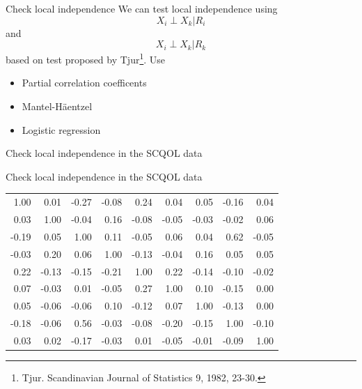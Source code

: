 \documentclass{beamer}
\begin{document}
\begin{frame}{Check local independence}
We can test local independence using
$$
X_i\perp X_k|R_i
$$
and
$$
X_i\perp X_k|R_k
$$
based on test proposed by Tjur\footnote{Tjur. Scandinavian Journal of Statistics 9, 1982, 23-30.}. Use
\begin{itemize}
\item Partial correlation coefficents
\item Mantel-H{\"a}entzel
\item Logistic regression
\end{itemize}
\end{frame}


\begin{frame}{Check local independence in the SCQOL data}

\end{frame}


\begin{frame}{Check local independence in the SCQOL data}
\begin{center}
\begin{tabular}{|rrrrrrrrr|}
\hline
 1.00 & 0.01 &-0.27 &-0.08 & 0.24 & 0.04 & 0.05 &-0.16 & 0.04 \\
 0.03 & 1.00 &-0.04 & 0.16 &-0.08 &-0.05 &-0.03 &-0.02 & 0.06 \\
-0.19 & 0.05 & 1.00 & 0.11 &-0.05 & 0.06 & 0.04 & 0.62 &-0.05 \\
-0.03 & 0.20 & 0.06 & 1.00 &-0.13 &-0.04 & 0.16 & 0.05 & 0.05 \\
 0.22 &-0.13 &-0.15 &-0.21 & 1.00 & 0.22 &-0.14 &-0.10 &-0.02 \\
 0.07 &-0.03 & 0.01 &-0.05 & 0.27 & 1.00 & 0.10 &-0.15 & 0.00 \\
 0.05 &-0.06 &-0.06 & 0.10 &-0.12 & 0.07 & 1.00 &-0.13 & 0.00 \\
-0.18 &-0.06 & 0.56 &-0.03 &-0.08 &-0.20 &-0.15 & 1.00 &-0.10 \\
 0.03 & 0.02 &-0.17 &-0.03 & 0.01 &-0.05 &-0.01 &-0.09 & 1.00 \\
\hline
\end{tabular}
\end{center}
\end{frame}
\end{document}
